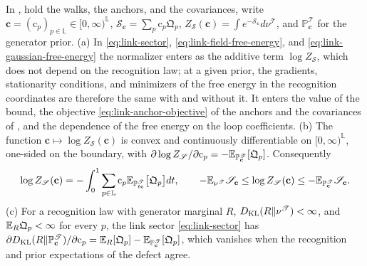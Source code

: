 In , hold the walks, the anchors, and the covariances, write
$\mathbf c=(\mathrm c_p)_{p\in\mathbb L}\in[0,\infty)^{\mathbb L}$, $\mathscr S_{\mathbf c}=\sum_p\mathrm c_p\mathfrak Q_p$,
$Z_{\mathscr S}(\mathbf c)=\int e^{-\mathscr S_{\mathbf c}}d\nu^{\mathscr T}$, and
$\mathbb P^{\mathscr T}_{\mathbf c}$ for the generator prior.
(a) In \eqref{eq:link-sector}, \eqref{eq:link-field-free-energy}, and \eqref{eq:link-gaussian-free-energy}
the normalizer enters as the additive term $\log Z_{\mathscr S}$, which does not depend on the recognition
law; at a given prior, the gradients, stationarity conditions, and minimizers of the free energy in the
recognition coordinates are therefore the same with and without it. It enters the value of the bound,
the objective \eqref{eq:link-anchor-objective} of the anchors and the covariances of
, and the dependence of the free energy on the loop coefficients.
(b) The function $\mathbf c\mapsto\log Z_{\mathscr S}(\mathbf c)$ is convex and continuously differentiable
on $[0,\infty)^{\mathbb L}$, one-sided on the boundary, with
$\partial\log Z_{\mathscr S}/\partial\mathrm c_p=-\mathbb E_{\mathbb P^{\mathscr T}_{\mathbf c}}[\mathfrak Q_p]$. Consequently
\begin{equation}
\log Z_{\mathscr S}(\mathbf c)=-\int_0^1\sum_{p\in\mathbb L}\mathrm c_p\mathbb E_{\mathbb P^{\mathscr T}_{t\mathbf c}}\bigl[\mathfrak Q_p\bigr]dt,
\qquad
-\mathbb E_{\nu^{\mathscr T}}\mathscr S_{\mathbf c}\leq\log Z_{\mathscr S}(\mathbf c)\leq-\mathbb E_{\mathbb P^{\mathscr T}_{\mathbf c}}\mathscr S_{\mathbf c}.
\label{eq:link-normalizer-integral}
\end{equation}
(c) For a recognition law with generator marginal $R$, $D_{\mathrm{KL}}(R\Vert\nu^{\mathscr T})<\infty$, and
$\mathbb E_R\mathfrak Q_p<\infty$ for every $p$, the link sector \eqref{eq:link-sector} has
$\partial D_{\mathrm{KL}}(R\Vert\mathbb P^{\mathscr T}_{\mathbf c})/\partial\mathrm c_p=\mathbb E_R[\mathfrak Q_p]-\mathbb E_{\mathbb P^{\mathscr T}_{\mathbf c}}[\mathfrak Q_p]$,
which vanishes when the recognition and prior expectations of the defect agree.

